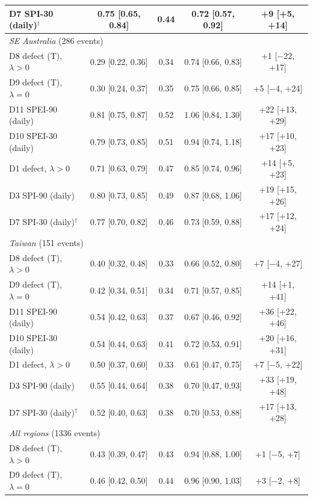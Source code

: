 \begin{table}[tbp]
\begin{tabular*}{\textwidth}{@{\extracolsep\fill}lcccc}
\quad D7 SPI-30 (daily)$^{\dagger}$ & 0.75 [0.65, 0.84] & 0.44 & 0.72 [0.57, 0.92] & +9 [+5, +14] \\
\midrule
\multicolumn{5}{l}{\textit{SE Australia} (286 events)}\\
\quad D8 defect (T), $\lambda>0$ & 0.29 [0.22, 0.36] & 0.34 & 0.74 [0.66, 0.83] & +1 [$-$22, +17] \\
\quad D9 defect (T), $\lambda=0$ & 0.30 [0.24, 0.37] & 0.35 & 0.75 [0.66, 0.85] & +5 [$-$4, +24] \\
\quad D11 SPEI-90 (daily) & 0.81 [0.75, 0.87] & 0.52 & 1.06 [0.84, 1.30] & +22 [+13, +29] \\
\quad D10 SPEI-30 (daily) & 0.79 [0.73, 0.85] & 0.51 & 0.94 [0.74, 1.18] & +17 [+10, +23] \\
\quad D1 defect, $\lambda>0$ & 0.71 [0.63, 0.79] & 0.47 & 0.85 [0.74, 0.96] & +14 [+5, +23] \\
\quad D3 SPI-90 (daily) & 0.80 [0.73, 0.85] & 0.49 & 0.87 [0.68, 1.06] & +19 [+15, +26] \\
\quad D7 SPI-30 (daily)$^{\dagger}$ & 0.77 [0.70, 0.82] & 0.46 & 0.73 [0.59, 0.88] & +17 [+12, +24] \\
\midrule
\multicolumn{5}{l}{\textit{Taiwan} (151 events)}\\
\quad D8 defect (T), $\lambda>0$ & 0.40 [0.32, 0.48] & 0.33 & 0.66 [0.52, 0.80] & +7 [$-$4, +27] \\
\quad D9 defect (T), $\lambda=0$ & 0.42 [0.34, 0.51] & 0.34 & 0.71 [0.57, 0.85] & +14 [+1, +41] \\
\quad D11 SPEI-90 (daily) & 0.54 [0.42, 0.63] & 0.37 & 0.67 [0.46, 0.92] & +36 [+22, +46] \\
\quad D10 SPEI-30 (daily) & 0.54 [0.44, 0.63] & 0.41 & 0.72 [0.53, 0.91] & +20 [+16, +31] \\
\quad D1 defect, $\lambda>0$ & 0.50 [0.37, 0.60] & 0.33 & 0.61 [0.47, 0.75] & +7 [$-$5, +22] \\
\quad D3 SPI-90 (daily) & 0.55 [0.44, 0.64] & 0.38 & 0.70 [0.47, 0.93] & +33 [+19, +48] \\
\quad D7 SPI-30 (daily)$^{\dagger}$ & 0.52 [0.40, 0.63] & 0.38 & 0.70 [0.53, 0.88] & +17 [+13, +28] \\
\midrule
\multicolumn{5}{l}{\textit{All regions} (1336 events)}\\
\quad D8 defect (T), $\lambda>0$ & 0.43 [0.39, 0.47] & 0.43 & 0.94 [0.88, 1.00] & +1 [$-$5, +7] \\
\quad D9 defect (T), $\lambda=0$ & 0.46 [0.42, 0.50] & 0.44 & 0.96 [0.90, 1.03] & +3 [$-$2, +8] \\

\end{tabular*}
\end{table}
